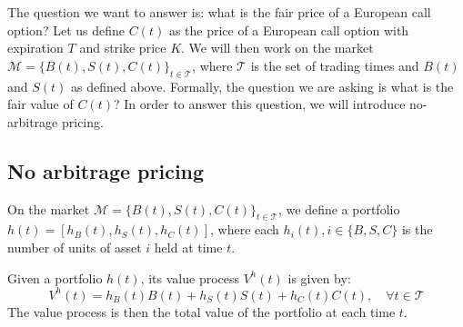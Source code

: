 The question we want to answer is: what is the fair price of a European call option? Let us define $C(t)$ as the price of a European call option with expiration $T$ and strike price $K$. We will then work on the market $\mathcal{M} = \{B(t),S(t),C(t)\}_{t\in\mathcal{T}}$, where $\mathcal{T}$ is the set of trading times and $B(t)$ and $S(t)$ as defined above. Formally, the question we are asking is what is the fair value of $C(t)$? In order to answer this question, we will introduce no-arbitrage pricing.

\subsection{No arbitrage pricing}
On the market $\mathcal{M} = \{B(t),S(t),C(t)\}_{t\in\mathcal{T}}$, we define a portfolio $h(t) = [h_B(t),h_S(t),h_C(t)]$, where each $h_i(t), i\in \{B,S,C\}$ is the number of units of asset $i$ held at time $t$. 
\begin{definition}
    Given a portfolio $h(t)$, its value process $V^h(t)$ is given by:
    \begin{equation}
        V^h(t) = h_B(t)B(t) + h_S(t)S(t) + h_C(t)C(t), \quad \forall t\in\mathcal{T}
    \end{equation}
    The value process is then the total value of the portfolio at each time $t$.
\end{definition}

